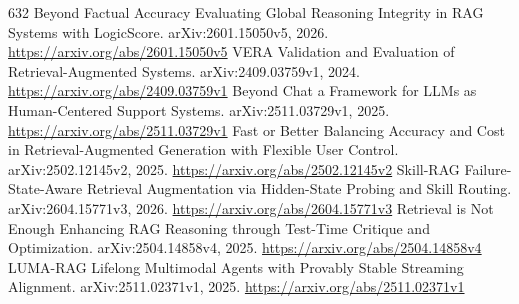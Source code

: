 \documentclass[11pt]{article}
\begin{document}
\begin{thebibliography}{632}
 Beyond Factual Accuracy Evaluating Global Reasoning Integrity in RAG Systems with LogicScore. arXiv:2601.15050v5, 2026. \url{https://arxiv.org/abs/2601.15050v5}
 VERA Validation and Evaluation of Retrieval-Augmented Systems. arXiv:2409.03759v1, 2024. \url{https://arxiv.org/abs/2409.03759v1}
 Beyond Chat a Framework for LLMs as Human-Centered Support Systems. arXiv:2511.03729v1, 2025. \url{https://arxiv.org/abs/2511.03729v1}
 Fast or Better Balancing Accuracy and Cost in Retrieval-Augmented Generation with Flexible User Control. arXiv:2502.12145v2, 2025. \url{https://arxiv.org/abs/2502.12145v2}
 Skill-RAG Failure-State-Aware Retrieval Augmentation via Hidden-State Probing and Skill Routing. arXiv:2604.15771v3, 2026. \url{https://arxiv.org/abs/2604.15771v3}
 Retrieval is Not Enough Enhancing RAG Reasoning through Test-Time Critique and Optimization. arXiv:2504.14858v4, 2025. \url{https://arxiv.org/abs/2504.14858v4}
 LUMA-RAG Lifelong Multimodal Agents with Provably Stable Streaming Alignment. arXiv:2511.02371v1, 2025. \url{https://arxiv.org/abs/2511.02371v1}
\end{thebibliography}
\end{document}
